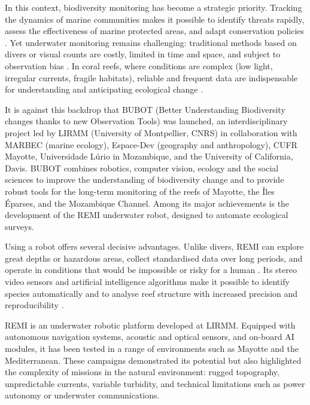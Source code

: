 In this context, biodiversity monitoring has become a strategic priority. Tracking the dynamics of marine communities makes it possible to identify threats rapidly, assess the effectiveness of marine protected areas, and adapt conservation policies \cite{HoeghGuldberg2017,Yuan2024}. Yet underwater monitoring remains challenging: traditional methods based on divers or visual counts are costly, limited in time and space, and subject to observation bias \cite{Edgar2004}. In coral reefs, where conditions are complex (low light, irregular currents, fragile habitats), reliable and frequent data are indispensable for understanding and anticipating ecological change \cite{Maslin2021}.

It is against this backdrop that BUBOT (Better Understanding Biodiversity changes thanks to new Observation Tools) was launched, an interdisciplinary project led by LIRMM (University of Montpellier, CNRS) in collaboration with MARBEC (marine ecology), Espace-Dev (geography and anthropology), CUFR Mayotte, Universidade Lúrio in Mozambique, and the University of California, Davis. BUBOT combines robotics, computer vision, ecology and the social sciences to improve the understanding of biodiversity change and to provide robust tools for the long-term monitoring of the reefs of Mayotte, the Îles Éparses, and the Mozambique Channel. Among its major achievements is the development of the REMI underwater robot, designed to automate ecological surveys.

Using a robot offers several decisive advantages. Unlike divers, REMI can explore great depths or hazardous areas, collect standardised data over long periods, and operate in conditions that would be impossible or risky for a human \cite{GonzalezGarcia2020}. Its stereo video sensors and artificial intelligence algorithms make it possible to identify species automatically and to analyse reef structure with increased precision and reproducibility \cite{Villon2020,Saleh2022}.

REMI is an underwater robotic platform developed at LIRMM. Equipped with autonomous navigation systems, acoustic and optical sensors, and on-board AI modules, it has been tested in a range of environments such as Mayotte and the Mediterranean. These campaigns demonstrated its potential but also highlighted the complexity of missions in the natural environment: rugged topography, unpredictable currents, variable turbidity, and technical limitations such as power autonomy or underwater communications.

